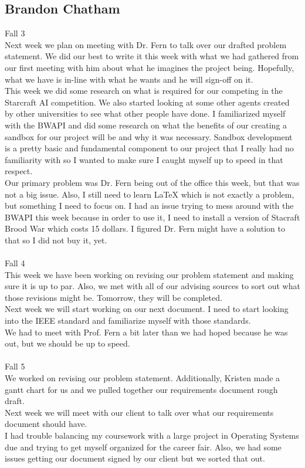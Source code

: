 \documentclass[10pt,letterpaper,onecolumn,draftclsnofoot]{IEEEtran}
\begin{document}
\subsection{Brandon Chatham}
Fall 3\\
Next week we plan on meeting with Dr. Fern to talk over our drafted problem statement. We did our best to write it this week with what we had gathered from our first meeting with him about what he imagines the project being. Hopefully, what we have is in-line with what he wants and he will sign-off on it.\\ This week we did some research on what is required for our competing in the Starcraft AI competition. We also started looking at some other agents created by other universities to see what other people have done. I familiarized myself with the BWAPI and did some research on what the benefits of our creating a sandbox for our project will be and why it was necessary. Sandbox development is a pretty basic and fundamental component to our project that I really had no familiarity with so I wanted to make sure I caught myself up to speed in that respect.\\ Our primary problem was Dr. Fern being out of the office this week, but that was not a big issue. Also, I still need to learn LaTeX which is not exactly a problem, but something I need to focus on. I had an issue trying to mess around with the BWAPI this week because in order to use it, I need to install a version of Stacraft Brood War which costs 15 dollars. I figured Dr. Fern might have a solution to that so I did not buy it, yet.\\
\\
Fall 4\\
This week we have been working on revising our problem statement and making sure it is up to par. Also, we met with all of our advising sources to sort out what those revisions might be. Tomorrow, they will be completed.\\ Next week we will start working on our next document. I need to start looking into the IEEE standard and familiarize myself with those standards.\\ We had to meet with Prof. Fern a bit later than we had hoped because he was out, but we should be up to speed.\\
\\
Fall 5\\
We worked on revising our problem statement. Additionally, Kristen made a gantt chart for us and we pulled together our requirements document rough draft.\\ Next week we will meet with our client to talk over what our requirements document should have.\\ I had trouble balancing my coursework with a large project in Operating Systems due and trying to get myself organized for the career fair. Also, we had some issues getting our document signed by our client but we sorted that out.\\
\end{document}
